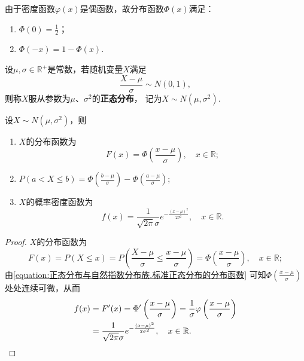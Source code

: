 \begin{property}
由于密度函数\(\varphi(x)\)是偶函数，故分布函数\(\Phi(x)\)满足：
\begin{enumerate}
\item \(\Phi(0) = \frac{1}{2}\)；
\item \(\Phi(-x) = 1 - \Phi(x)\).
\end{enumerate}
\end{property}

\begin{definition}
设\(\mu,\sigma\in\mathbb{R}^+\)是常数，若随机变量\(X\)满足\[
\frac{X-\mu}{\sigma} \sim N(0,1),
\]则称\(X\)服从参数为\(\mu\)、\(\sigma^2\)的\textbf{正态分布}，%
记为\(X \sim N(\mu,\sigma^2)\).
\end{definition}

\begin{theorem}
设\(X \sim N(\mu,\sigma^2)\)，则
\begin{enumerate}
\item \(X\)的分布函数为\[
F(x) = \Phi\left(\frac{x-\mu}{\sigma}\right),
\quad x\in\mathbb{R};
\]
\item \(P(a < X \leqslant b) = \Phi\left(\frac{b-\mu}{\sigma}\right) - \Phi\left(\frac{a-\mu}{\sigma}\right)\);
\item \(X\)的概率密度函数为\[
f(x) = \frac{1}{\sqrt{2 \pi} \sigma} e^{-\frac{(x-\mu)^2}{2\sigma^2}},
\quad x\in\mathbb{R}.
\]
\end{enumerate}
\begin{proof}
\(X\)的分布函数为\[
F(x) = P(X \leqslant x)
= P\left(\frac{X-\mu}{\sigma}\leqslant\frac{x-\mu}{\sigma}\right)
= \Phi\left(\frac{x-\mu}{\sigma}\right), \quad x\in\mathbb{R};
\]由\cref{equation:正态分布与自然指数分布族.标准正态分布的分布函数} 可知\(\Phi\left(\frac{x-\mu}{\sigma}\right)\)处处连续可微，从而\begin{align*}
f(x) &= F'(x) = \Phi'\left(\frac{x-\mu}{\sigma}\right)
= \frac{1}{\sigma} \varphi\left(\frac{x-\mu}{\sigma}\right) \\
&= \frac{1}{\sqrt{2 \pi} \sigma} e^{-\frac{(x-\mu)^2}{2\sigma^2}},
\quad x\in\mathbb{R}.
\qedhere
\end{align*}
\end{proof}
\end{theorem}


